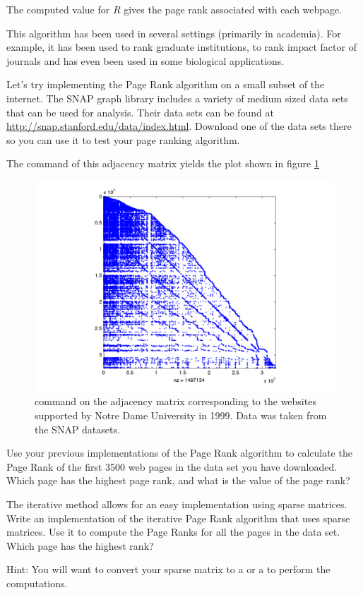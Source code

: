 The computed value for $R$ gives the page rank associated with each webpage.

This algorithm has been used in several settings (primarily in academia).
For example, it has been used to rank graduate institutions, to rank impact factor of journals and has even been used in some biological applications.

Let's try implementing the Page Rank algorithm on a small subset of the internet.
The SNAP graph library includes a variety of medium sized data sets that can be used for analysis.
Their data sets can be found at \url{http://snap.stanford.edu/data/index.html}.
Download one of the data sets there so you can use it to test your page ranking algorithm.

The  command of this adjacency matrix yields the plot shown in figure \ref{fig:WebSparse}

\begin{figure}
\centering
\includegraphics[scale = .4]{WebSparse.pdf}
\caption{ command on the adjacency matrix corresponding to the websites supported by Notre Dame University in 1999.
Data was taken from the SNAP datasets.}
\label{fig:WebSparse}
\end{figure}

\begin{problem}
Use your previous implementations of the Page Rank algorithm to calculate the Page Rank of the first 3500 web pages in the data set you have downloaded.
Which page has the highest page rank, and what is the value of the page rank?
\label{prob:pg_calc}
\end{problem}

\begin{problem}
The iterative method allows for an easy implementation using sparse matrices.
Write an implementation of the iterative Page Rank algorithm that uses sparse matrices.
Use it to compute the Page Ranks for all the pages in the data set.
Which page has the highest rank?

Hint: You will want to convert your sparse matrix to a  or a  to perform the computations.
\end{problem}
